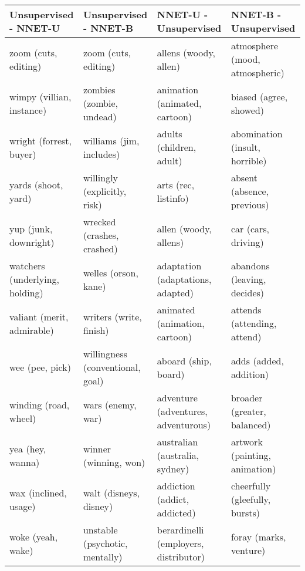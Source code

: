 \begin{landscape}
\begin{table}[]
	\scriptsize
	\centering
	\setlength\extrarowheight{-0.5pt}
	\begin{tabular}{llll}
		Unsupervised - NNET-U          & Unsupervised - NNET-B              & NNET-U - Unsupervised                 & NNET-B - Unsupervised                \\
		\toprule
		zoom (cuts, editing)           & zoom (cuts, editing)               & allens (woody, allen)                 & atmosphere (mood, atmospheric)       \\
		wimpy (villian, instance)      & zombies (zombie, undead)           & animation (animated, cartoon)         & biased (agree, showed)               \\
		wright (forrest, buyer)        & williams (jim, includes)           & adults (children, adult)              & abomination (insult, horrible)       \\
		yards (shoot, yard)            & willingly (explicitly, risk)       & arts (rec, listinfo)                  & absent (absence, previous)           \\
		yup (junk, downright)          & wrecked (crashes, crashed)         & allen (woody, allens)                 & car (cars, driving)                  \\
		watchers (underlying, holding) & welles (orson, kane)               & adaptation (adaptations, adapted)     & abandons (leaving, decides)          \\
		valiant (merit, admirable)     & writers (write, finish)            & animated (animation, cartoon)         & attends (attending, attend)          \\
		wee (pee, pick)                & willingness (conventional, goal)   & aboard (ship, board)                  & adds (added, addition)               \\
		winding (road, wheel)          & wars (enemy, war)                  & adventure (adventures, adventurous)   & broader (greater, balanced)          \\
		yea (hey, wanna)               & winner (winning, won)              & australian (australia, sydney)        & artwork (painting, animation)        \\
		wax (inclined, usage)          & walt (disneys, disney)             & addiction (addict, addicted)          & cheerfully (gleefully, bursts)       \\
		woke (yeah, wake)              & unstable (psychotic, mentally)     & berardinelli (employers, distributor) & foray (marks, venture)               \\

\end{tabular}
\end{table}
\end{landscape}
